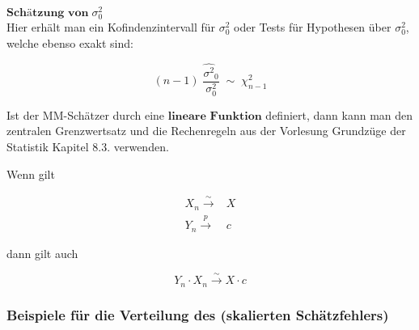 \documentclass[10pt]{article}
\newcommand{\KW}{\overset{p} \longrightarrow} %
\newcommand{\KV}{\overset{\sim} \longrightarrow} %
\begin{document}
		\noindent $\textbf{Schätzung von} \; \sigma^2_0$\\
	Hier erhält man ein Kofindenzintervall für $\sigma^2_0$ oder Tests für Hypothesen über $\sigma^2_0$, welche ebenso exakt sind:
	
	
	\begin{equation*}
		(n-1) \; \frac{\hat{\sigma^2}_0}{\sigma^2_0} \; {\sim} \; \chi^2_{n-1}
	\end{equation*}
	
	
		\noindent Ist der MM-Schätzer durch eine $\textbf{lineare Funktion}$ definiert, dann kann man den zentralen Grenzwertsatz und die Rechenregeln aus der Vorlesung Grundzüge der Statistik Kapitel 8.3. verwenden. 
	
	\noindent Wenn gilt
	
	\begin{equation*}
		\begin{split}
				X_n \KV& X \\
			Y_n \KW& c 
		\end{split}
	\end{equation*}
	
	\noindent dann gilt auch
	
	\begin{equation*}
		Y_n \cdot X_n \KV X\cdot c
	\end{equation*}
	
	
	\subsubsection{Beispiele für die Verteilung des (skalierten Schätzfehlers)}
	
\end{document}
